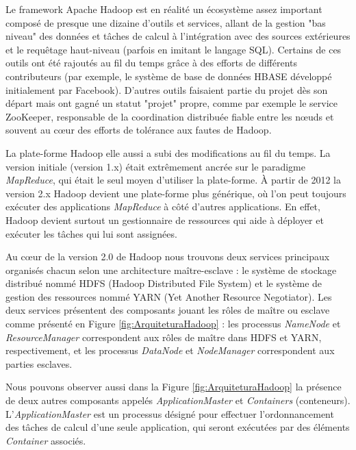 Le framework Apache Hadoop est en réalité un écosystème assez important composé de presque une dizaine d'outils et services, allant de la gestion "bas niveau" des données et tâches de calcul à l'intégration avec des sources extérieures et le requêtage haut-niveau (parfois en imitant le langage SQL). Certains de ces outils ont été rajoutés au fil du temps grâce à des efforts de différents contributeurs (par exemple, le système de base de données HBASE développé initialement par Facebook). D'autres outils faisaient partie du projet dès son départ mais ont gagné un statut "projet" propre, comme par exemple le service ZooKeeper, responsable de la coordination distribuée fiable entre les n{\oe}uds et souvent au c{\oe}ur des efforts de tolérance aux fautes de Hadoop.

La plate-forme Hadoop elle aussi a subi des modifications au fil du temps. La version initiale (version 1.x) était extrêmement ancrée sur le paradigme \textit{MapReduce}, qui était le seul moyen d'utiliser la plate-forme. À partir de 2012 la version 2.x Hadoop devient une plate-forme plus générique, où l'on peut toujours exécuter des applications \textit{MapReduce} à côté d'autres applications. En effet, Hadoop devient surtout un gestionnaire de ressources qui aide à déployer et exécuter les tâches qui lui sont assignées.  

Au c{\oe}ur de la version 2.0 de Hadoop nous trouvons deux services principaux organisés chacun selon une architecture maître-esclave : le système de stockage distribué nommé HDFS (Hadoop Distributed File System) et le système de gestion des ressources nommé YARN (Yet Another Resource Negotiator). Les deux services présentent des composants jouant les rôles de maître ou esclave comme présenté en Figure \ref{fig:ArquiteturaHadoop} : les processus \textit{NameNode} et \textit{ResourceManager} correspondent aux rôles de maître dans HDFS et YARN, respectivement, et les processus \textit{DataNode} et \textit{NodeManager} correspondent aux parties esclaves. 

Nous pouvons observer aussi dans la Figure \ref{fig:ArquiteturaHadoop} la présence de deux autres composants appelés \textit{ApplicationMaster} et \textit{Containers} (conteneurs). L'\textit{ApplicationMaster} est un processus désigné pour effectuer l'ordonnancement des tâches de calcul d'une seule application, qui seront exécutées par des éléments \textit{Container} associés.  

